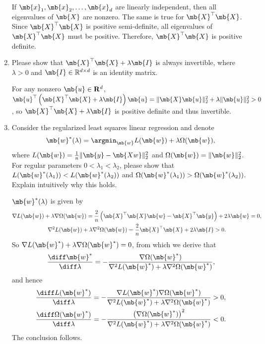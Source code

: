 \begin{exercise}
\begin{enumerate}
\begin{solution}
                If $\mb{x}_1, \mb{x}_2, \dots, \mb{x}_d$ are linearly independent, then all eigenvalues of $\mb{X}$ are nonzero. The same is true for $\mb{X}^\top\mb{X}$. Since $\mb{X}^{\top}\mb{X}$ is positive semi-definite, all eigenvalues of $\mb{X}^{\top}\mb{X}$ must be positive. Therefore, $\mb{X}^{\top}\mb{X}$ is positive definite.
                \qedhere
            \end{solution}
        \item Please show that $\mb{X}^{\top}\mb{X} + \lambda \mb{I}$ is always invertible, where $\lambda>0$ and $\mb{I}\in \mathbb{R}^{d\times d}$ is an identity matrix.
            \begin{solution}
                For any nonzero $\mb{u}\in\mathbf{R}^d$, $\mb{u}^\top\left(\mb{X}^{\top}\mb{X}+\lambda\mb{I}\right)\mb{u} = \|\mb{X}\mb{u}\|^2_2 + \lambda\|\mb{u}\|^2_2 > 0$, so $\mb{X}^{\top}\mb{X}+\lambda\mb{I}$ is positive definite and thus invertible.
                \qedhere
            \end{solution}
        \item Consider the regularized least squares linear regression and denote
            $$
                \mb{w}^*(\lambda)=\argmin_\mb{w} L(\mb{w})+\lambda \Omega(\mb{w}),
            $$
            where $L(\mb{w})=\frac{1}{n}\|\mb{y}-\mb{Xw}\|_2^2$ and $\Omega(\mb{w})=\|\mb{w}\|_2^2$. For regular parameters $0<\lambda_1<\lambda_2$, please show that $L(\mb{w}^*(\lambda_1)) < L(\mb{w}^*(\lambda_2))$ and $\Omega (\mb{w}^*(\lambda_1)) > \Omega (\mb{w}^*(\lambda_2))$. Explain intuitively why this holds.
            \begin{solution}
                $\mb{w}^*(\lambda)$ is given by
                \begin{gather*}
                    \nabla L(\mb{w}) + \lambda\nabla \Omega(\mb{w}) = \frac{2}{n}\left(\mb{X}^{\top}\mb{X}\mb{w}-\mb{X}^{\top}\mb{y}\right)+2\lambda\mb{w} = 0,\\
                    \nabla^2 L(\mb{w}) + \lambda\nabla^2 \Omega(\mb{w}) = \frac{2}{n}\mb{X}^{\top}\mb{X}+2\lambda\mb{I} > 0.
                \end{gather*}
                So $\nabla L(\mb{w}^*) + \lambda\nabla \Omega(\mb{w}^*) = 0$, from which we derive that
                \begin{gather*}
                    \frac{\diff \mb{w}^*}{\diff \lambda} = -\frac{\nabla \Omega(\mb{w}^*)}{\nabla^2 L(\mb{w}^*) + \lambda\nabla^2 \Omega(\mb{w}^*)},
                \end{gather*}
                and hence
                \begin{gather*}
                    \frac{\diff L(\mb{w}^*)}{\diff \lambda} = -\frac{\nabla L(\mb{w}^*)\nabla \Omega(\mb{w}^*)}{\nabla^2 L(\mb{w}^*) + \lambda\nabla^2 \Omega(\mb{w}^*)} > 0, \\
                    \frac{\diff \Omega(\mb{w}^*)}{\diff \lambda} = -\frac{\left(\nabla \Omega(\mb{w}^*)\right)^2}{\nabla^2 L(\mb{w}^*) + \lambda\nabla^2 \Omega(\mb{w}^*)} < 0.
                \end{gather*}
                The conclusion follows. 
                

\end{solution}
\end{enumerate}
\end{exercise}

